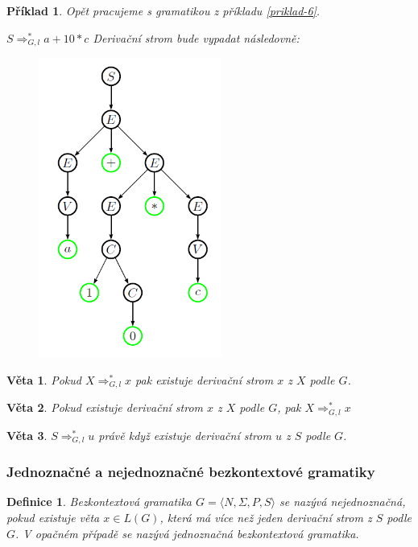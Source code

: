 \documentclass[10pt,a4paper]{article}
\theoremstyle{note}
\newtheorem{veta}{Věta}
\newtheorem{definice}{Definice}
\newtheorem{priklad}{Příklad}
\begin{document}
\begin{priklad}
Opět pracujeme s gramatikou z příkladu \ref{priklad-6}.

$S \Rightarrow_{G,l}^* a+10*c$ \quad Derivační strom bude vypadat následovně:

			\begin{figure}[H]
			\centering
			\includegraphics[width=6cm]{img/bez1.png}
			\end{figure}
\end{priklad}

\begin{veta}
Pokud $X \Rightarrow_{G,l}^* x$ pak existuje derivační strom $x$ z $X$ podle $G$.
\end{veta}


\begin{veta}
Pokud existuje derivační strom $x$ z $X$ podle $G$, pak $X \Rightarrow_{G,l}^* x$
\end{veta}


\begin{veta}
$S\Rightarrow_{G,l}^* u$ právě když existuje derivační strom $u$ z $S$ podle $G$.
\end{veta}

\subsubsection{Jednoznačné a nejednoznačné bezkontextové gramatiky}

\begin{definice}
Bezkontextová gramatika $G = \langle N,\Sigma,P,S \rangle$ se nazývá nejednoznačná, pokud existuje věta $x \in L(G)$, která má více než jeden derivační strom z $S$ podle $G$. V opačném případě se nazývá jednoznačná bezkontextová gramatika.
\end{definice}
\end{document}
